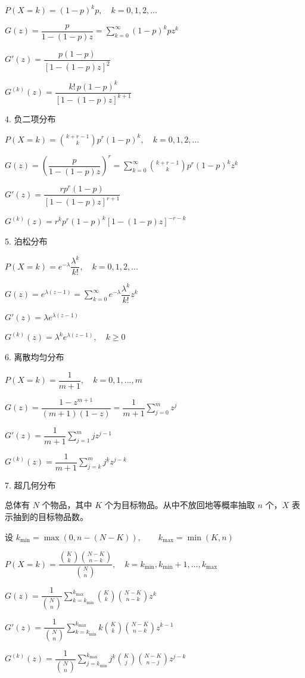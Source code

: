 $P(X=k)=(1-p)^kp,\quad k=0,1,2,\dots$

$G(z)=\dfrac{p}{1-(1-p)z}=\displaystyle\sum_{k=0}^{\infty}(1-p)^kp z^k$

$G'(z)=\dfrac{p(1-p)}{[1-(1-p)z]^2}$

$G^{(k)}(z)=\dfrac{k!\,p(1-p)^k}{[1-(1-p)z]^{k+1}}$

4. 负二项分布

$P(X=k)=\binom{k+r-1}{k}p^r(1-p)^k,\quad k=0,1,2,\dots$

$G(z)=\left(\dfrac{p}{1-(1-p)z}\right)^r=\displaystyle\sum_{k=0}^{\infty}\binom{k+r-1}{k}p^r(1-p)^k z^k$

$G'(z)=\dfrac{rp^r(1-p)}{[1-(1-p)z]^{r+1}}$

$G^{(k)}(z)=r^{\overline{k}}p^r(1-p)^k[1-(1-p)z]^{-r-k}$

5. 泊松分布

$P(X=k)=e^{-\lambda}\dfrac{\lambda^k}{k!},\quad k=0,1,2,\dots$

$G(z)=e^{\lambda(z-1)}=\displaystyle\sum_{k=0}^{\infty}e^{-\lambda}\dfrac{\lambda^k}{k!}z^k$

$G'(z)=\lambda e^{\lambda(z-1)}$

$G^{(k)}(z)=\lambda^k e^{\lambda(z-1)},\quad k\ge 0$

6. 离散均匀分布

$P(X=k)=\dfrac1{m+1},\quad k=0,1,\dots,m$

$G(z)=\dfrac{1-z^{m+1}}{(m+1)(1-z)}=\dfrac1{m+1}\displaystyle\sum_{j=0}^{m} z^j$

$G'(z)=\dfrac1{m+1}\displaystyle\sum_{j=1}^{m} jz^{j-1}$

$G^{(k)}(z)=\dfrac1{m+1}\displaystyle\sum_{j=k}^{m} j^{\underline{k}}z^{j-k}$

7. 超几何分布

总体有 $N$ 个物品，其中 $K$ 个为目标物品。从中不放回地等概率抽取 $n$ 个，$X$ 表示抽到的目标物品数。

设 $k_{\min}=\max(0,n-(N-K)),\qquad k_{\max}=\min(K,n)$

$P(X=k)=\dfrac{\binom{K}{k}\binom{N-K}{n-k}}{\binom{N}{n}},\quad k=k_{\min},k_{\min}+1,\dots,k_{\max}$

$G(z)=\dfrac1{\binom{N}{n}}\displaystyle\sum_{k=k_{\min}}^{k_{\max}}\binom{K}{k}\binom{N-K}{n-k}z^k$

$G'(z)=\dfrac1{\binom{N}{n}}\displaystyle\sum_{k=k_{\min}}^{k_{\max}} k\binom{K}{k}\binom{N-K}{n-k}z^{k-1}$

$G^{(k)}(z)=\dfrac1{\binom{N}{n}}\displaystyle\sum_{j=k_{\min}}^{k_{\max}} j^{\underline{k}}\binom{K}{j}\binom{N-K}{n-j}z^{j-k}$


